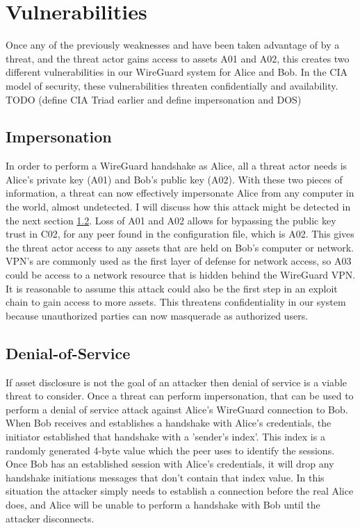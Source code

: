 \documentclass [11pt, proquest] {uwthesis}[2020/02/24]
\begin{document}
\section{Vulnerabilities}
Once any of the previously weaknesses and have been taken advantage of by a threat, and the threat actor gains access to assets A01 and A02, this creates two different vulnerabilities in our WireGuard system for Alice and Bob. In the CIA model of security, these vulnerabilities threaten confidentially and availability. TODO (define CIA Triad earlier and define impersonation and DOS)
\subsection{Impersonation}
\label{impersonation}
In order to perform a WireGuard handshake as Alice, all a threat actor needs is Alice's private key (A01) and Bob's public key (A02). With these two pieces of information, a threat can now effectively impersonate Alice from any computer in the world, almost undetected. I will discuss how this attack might be detected in the next section \ref{dos}. Loss of A01 and A02 allows for bypassing the public key trust in C02, for any peer found in the configuration file, which is A02. This gives the threat actor access to any assets that are held on Bob's computer or network. VPN's are commonly used as the first layer of defense for network access, so A03 could be access to a network resource that is hidden behind the WireGuard VPN. It is reasonable to assume this attack could also be the first step in an exploit chain to gain access to more assets.
This threatens confidentiality in our system because unauthorized parties can now masquerade as authorized users.

\subsection{Denial-of-Service}
\label{dos}
If asset disclosure is not the goal of an attacker then denial of service is a viable threat to consider. Once a threat can perform impersonation, that can be used to perform a denial of service attack against Alice's WireGuard connection to Bob. When Bob receives and establishes a handshake with Alice's credentials, the initiator established that handshake with a 'sender's index'. This index is a randomly generated 4-byte value which the peer uses to identify the sessions. Once Bob has an established session with Alice's credentials, it will drop any handshake initiations messages that don't contain that index value. In this situation the attacker simply needs to establish a connection before the real Alice does, and Alice will be unable to perform a handshake with Bob until the attacker disconnects.
\end{document}

